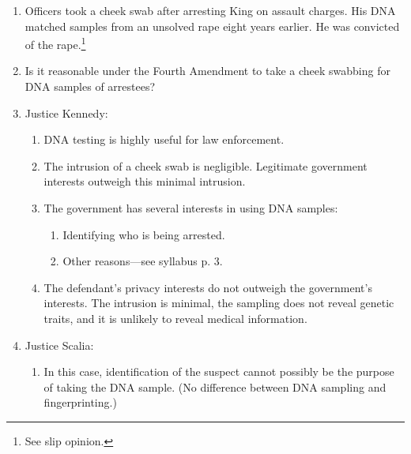 \begin{enumerate}
    \item Officers took a cheek swab after arresting King on assault charges. 
    His DNA matched samples from an unsolved rape eight years earlier. He was 
    convicted of the rape.\footnote{See slip opinion.}
    \item Is it reasonable under the Fourth Amendment to take a cheek swabbing 
    for DNA samples of arrestees?
    \item Justice Kennedy:
    \begin{enumerate}
        \item DNA testing is highly useful for law enforcement.
        \item The intrusion of a cheek swab is negligible. Legitimate government 
        interests outweigh this minimal intrusion.
        \item The government has several interests in using DNA samples:
        \begin{enumerate}
            \item Identifying who is being arrested.
            \item Other reasons---see syllabus p. 3.
        \end{enumerate}
        \item The defendant's privacy interests do not outweigh the government's 
        interests. The intrusion is minimal, the sampling does not reveal 
        genetic traits, and it is unlikely to reveal medical information.
    \end{enumerate}
    \item Justice Scalia:
    \begin{enumerate}
        \item In this case, identification of the suspect cannot possibly be the 
        purpose of taking the DNA sample. (No difference between DNA sampling 
        and fingerprinting.)
    \end{enumerate}
\end{enumerate}
